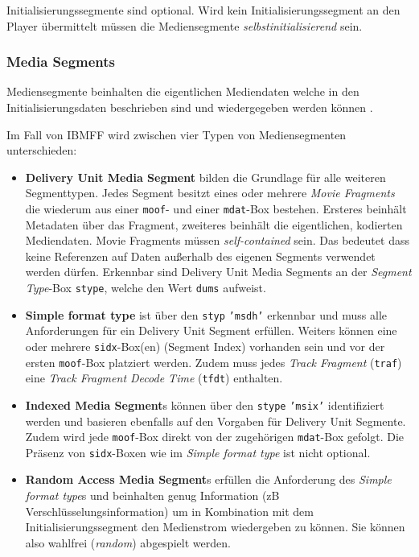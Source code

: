 \documentclass[paper = a4, fontsize = 12pt, parskip = half]{scrartcl} %
\def\attr#1{\texttt{#1}}
\begin{document}
Initialisierungssegmente sind optional. Wird kein Initialisierungssegment an den Player übermittelt müssen die Mediensegmente \textit{selbstinitialisierend} sein.

\subsubsection{Media Segments}
Mediensegmente beinhalten die eigentlichen Mediendaten welche in den Initialisierungsdaten beschrieben sind und wiedergegeben werden können \cite{international_organization_for_standardization_isoiec_nodate}.

Im Fall von IBMFF wird zwischen vier Typen von Mediensegmenten unterschieden:

\begin{itemize}
	\item \textbf{Delivery Unit Media Segment} bilden die Grundlage für alle weiteren Segmenttypen. Jedes Segment besitzt eines oder mehrere \textit{Movie Fragments} die wiederum aus einer \attr{moof}- und einer \attr{mdat}-Box bestehen. Ersteres beinhält Metadaten über das Fragment, zweiteres beinhält die eigentlichen, kodierten Mediendaten. Movie Fragments müssen \textit{self-contained} sein. Das bedeutet dass keine Referenzen auf Daten außerhalb des eigenen Segments verwendet werden dürfen. Erkennbar sind Delivery Unit Media Segments an der \textit{Segment Type}-Box \attr{stype}, welche den Wert \attr{dums} aufweist.
	\item \textbf{Simple format type} ist über den \attr{styp} \attr{'msdh'} erkennbar und muss alle Anforderungen für ein Delivery Unit Segment erfüllen. Weiters können eine oder mehrere \attr{sidx}-Box(en) (Segment Index) vorhanden sein und vor der ersten \attr{moof}-Box platziert werden. Zudem muss jedes \textit{Track Fragment} (\attr{traf}) eine \textit{Track Fragment Decode Time} (\attr{tfdt}) enthalten.
	\item \textbf{Indexed Media Segment}s können über den \attr{stype} \attr{'msix'} identifiziert werden und basieren ebenfalls auf den Vorgaben für Delivery Unit Segmente. Zudem wird jede \attr{moof}-Box direkt von der zugehörigen \attr{mdat}-Box gefolgt. Die Präsenz von \attr{sidx}-Boxen wie im \textit{Simple format type} ist nicht optional.
	\item \textbf{Random Access Media Segment}s erfüllen die Anforderung des \textit{Simple format type}s und beinhalten genug Information (zB Verschlüsselungsinformation) um in Kombination mit dem Initialisierungssegment den Medienstrom wiedergeben zu können. Sie können also wahlfrei (\textit{random}) abgespielt werden.
\end{itemize}
\end{document}

